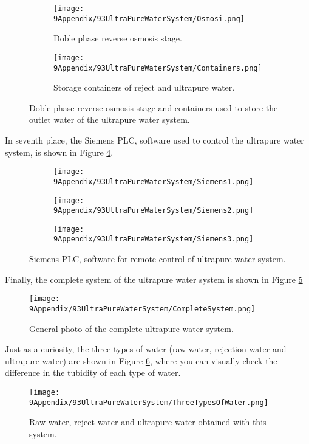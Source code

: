 \begin{figure}
\centering
    \begin{subfigure}[b]{0.3\textwidth}
    \centering
    \texttt{[image: 9Appendix/93UltraPureWaterSystem/Osmosi.png]}  
    \caption{Doble phase reverse osmosis stage.\label{subfig:Osmosi}}
    \end{subfigure}
    \hfill
    \begin{subfigure}[b]{0.5\textwidth}
    \centering
    \texttt{[image: 9Appendix/93UltraPureWaterSystem/Containers.png]}  
    \caption{Storage containers of reject and ultrapure water.\label{subfig:Containers}}
    \end{subfigure}
 \caption{Doble phase reverse osmosis stage and containers used to store the outlet water of the ultrapure water system.}
 \label{subfig:OsmosisContainers}
\end{figure}

In seventh place, the Siemens PLC, software used to control the ultrapure water system, is shown in Figure \ref{fig:Siemens}.

\begin{figure}
\centering
    \begin{subfigure}[b]{0.37\textwidth}
    \centering
    \texttt{[image: 9Appendix/93UltraPureWaterSystem/Siemens1.png]}  
    \caption{}
    \end{subfigure}
    \hfill
    \begin{subfigure}[b]{0.3\textwidth}
    \centering
    \texttt{[image: 9Appendix/93UltraPureWaterSystem/Siemens2.png]}  
    \caption{}
    \end{subfigure}
    \hfill
    \begin{subfigure}[b]{0.27\textwidth}
    \centering
    \texttt{[image: 9Appendix/93UltraPureWaterSystem/Siemens3.png]}  
    \caption{}
    \end{subfigure}
 \caption{Siemens PLC, software for remote control of ultrapure water system.}
 \label{fig:Siemens}
\end{figure}

Finally, the complete system of the ultrapure water system is shown in Figure \ref{fig:CompleteSystem}

\begin{figure}[htbp]
\centering
\texttt{[image: 9Appendix/93UltraPureWaterSystem/CompleteSystem.png]}
\caption{General photo of the complete ultrapure water system.\label{fig:CompleteSystem}}
\end{figure}

Just as a curiosity, the three types of water (raw water, rejection water and ultrapure water) are shown in Figure \ref{fig:ThreeTypesOfWater}, where you can visually check the difference in the tubidity of each type of water.

\begin{figure}[htbp]
\centering
\texttt{[image: 9Appendix/93UltraPureWaterSystem/ThreeTypesOfWater.png]}
\caption{Raw water, reject water and ultrapure water obtained with this system.\label{fig:ThreeTypesOfWater}}
\end{figure}
